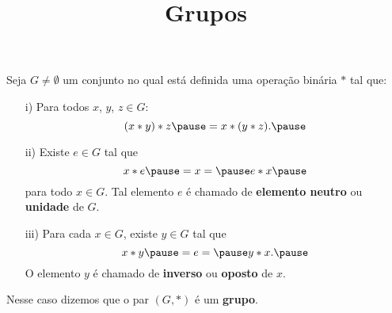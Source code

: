 \documentclass{beamer}
\title{Grupos}
\author[\autor]{\autor}
\institute[\instituto]{\instituto}
\date{}
\begin{document}
    \begin{frame}
        \maketitle
    \end{frame}


    \begin{frame}
        \begin{definicao}
            Seja $G \ne \emptyset$ \pause um conjunto no qual está definida uma operação binária $*$ \pause tal que:\pause
            \begin{enumerate}
                \item[i)] Para todos $x$, $y$, $z\in G$:\pause
                \[
                    (x*y)*z \pause = x*(y*z).\pause
                \]

                \item[ii)] Existe $e \in G$ \pause tal que\pause
                \[
                    x*e \pause = x = \pause e*x\pause
                \]
                para todo $x \in G$. \pause Tal elemento $e$ \pause é chamado de \textbf{elemento neutro} \pause ou \textbf{unidade} \pause de $G$.\pause

            \end{enumerate}
        \end{definicao}
    \end{frame}

    \begin{frame}
        \begin{definicao}
            \begin{enumerate}
                \item[iii)] Para cada $x \in G$, \pause existe $y \in G$ \pause tal que\pause
                \[
                    x*y \pause = e = \pause y*x.\pause
                \]
                O elemento $y$ \pause é chamado de \textbf{inverso} \pause ou \textbf{oposto} \pause de $x$.\pause
            \end{enumerate}
            Nesse caso dizemos que o par $(G, *)$ \pause é um \textbf{grupo}.\pause
        \end{definicao}
    \end{frame}
\end{document}
